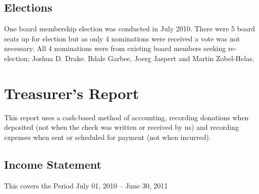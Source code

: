 \documentclass[letterpaper]{report}
\begin{document}
\section{Elections}

One board membership election was conducted in July 2010. There were 5 board
seats up for election but as only 4 nominations were received a vote was not
necessary. All 4 nominations were from existing board members seeking
re-election; Joshua D. Drake. Bdale Garbee, Joerg Jaspert and Martin
Zobel-Helas.

\chapter{Treasurer's Report}

This report uses a cash-based method of accounting, recording donations when
deposited (not when the check was written or received by us) and recording
expenses when sent or scheduled for payment (not when incurred).

\section{Income Statement}

This covers the Period July 01, 2010 -- June 30, 2011
\end{document}
